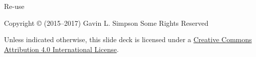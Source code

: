 \documentclass[11pt,ignorenonframetext,compress, aspectratio=169]{beamer}
\begin{document}
\begin{frame}{Re-use}

Copyright © (2015--2017) Gavin L. Simpson Some Rights Reserved

Unless indicated otherwise, this slide deck is licensed under a
\href{http://creativecommons.org/licenses/by/4.0/}{Creative Commons
Attribution 4.0 International License}.

\begin{center}
  \ccby
\end{center}

\end{frame}
\end{document}
